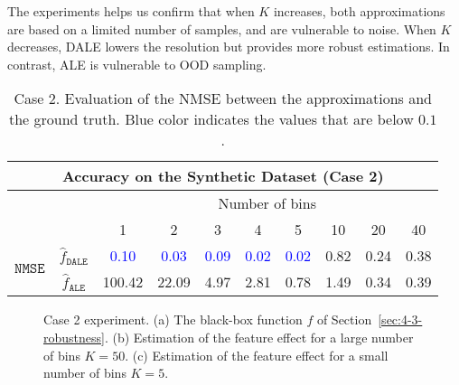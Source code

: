 \documentclass[wcp]{jmlr}
\newcommand{\dale}{\hat{f}_{\mathtt{DALE}}}
\newcommand{\alep}{\hat{f}_{\mathtt{ALE}}}
\begin{document}
The experiments helps us confirm that when \(K \) increases, both
approximations are based on a limited number of samples, and are
vulnerable to noise. When \(K\) decreases, DALE lowers the resolution
but provides more robust estimations. In contrast, ALE is vulnerable
to OOD sampling.

\begin{table}
  \centering
  \caption{Case 2. Evaluation of the NMSE between the approximations and the ground truth. Blue color indicates the values that are below \(0.1\).}
  \label{tab:case-2-accuracy}
  \begin{tabular}{c|c|c|c|c|c|c|c|c|c}
    \multicolumn{10}{c}{Accuracy on the Synthetic Dataset (Case 2)} \\
    \hline \hline
    & & \multicolumn{8}{|c}{Number of bins} \\
    \hline
    & & 1 & 2 & 3 & 4 & 5 & 10 & 20 & 40 \\
    \hline
    \hline
    \multirow{2}{*}{\(\mathtt{NMSE}\)} & \(\dale\) & \textcolor{blue}{0.10} & \textcolor{blue}{0.03} & \textcolor{blue}{0.09} & \textcolor{blue}{0.02} & \textcolor{blue}{0.02} & 0.82 & 0.24 & 0.38\\
    & \(\alep\) & 100.42 & 22.09 & 4.97 & 2.81 & 0.78 & 1.49 & 0.34 & 0.39 \\
    \hline
  \end{tabular}
\end{table}


\begin{figure}[h]
  \begin{center}
    \resizebox{.33\columnwidth}{!}{}
    \resizebox{.32\columnwidth}{!}{}
    \resizebox{.32\columnwidth}{!}{}
  \end{center}
  \caption[Case 2]{Case 2 experiment. (a) The black-box function \(f\)
    of Section~\ref{sec:4-3-robustness}. (b) Estimation of the
    feature effect for a large number of bins \(K=50\). (c)
    Estimation of the feature effect for a small number of bins
    \(K=5\).}
  \label{fig:example-2-samples}
\end{figure}
\end{document}
